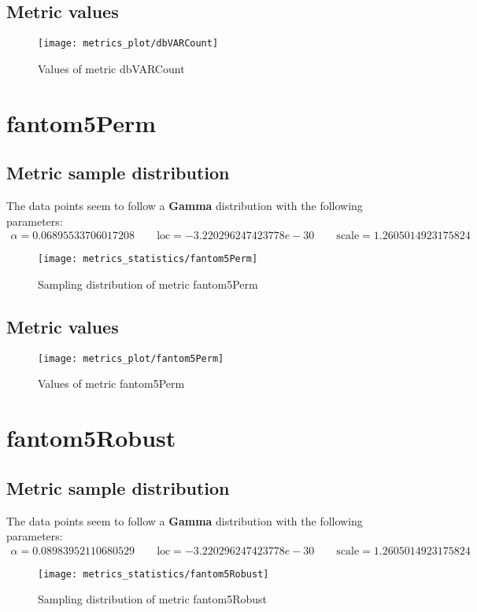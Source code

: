 \subsection{Metric values}
\begin{figure}
	\texttt{[image: metrics\_plot/dbVARCount]}
	\caption{Values of metric dbVARCount}
\end{figure}

\clearpage
\section{fantom5Perm}
\subsection{Metric sample distribution}
The data points seem to follow a \textbf{Gamma} distribution with the following parameters:
\begin{align*}
	\alpha   = 0.06895533706017208    \qquad  \text{loc} = -3.220296247423778e-30 \qquad \text{scale} = 1.2605014923175824
\end{align*}
\begin{figure}
	\texttt{[image: metrics\_statistics/fantom5Perm]}
	\caption{Sampling distribution of metric fantom5Perm}
\end{figure}
\subsection{Metric values}
\begin{figure}
	\texttt{[image: metrics\_plot/fantom5Perm]}
	\caption{Values of metric fantom5Perm}
\end{figure}

\clearpage
\section{fantom5Robust}
\subsection{Metric sample distribution}
The data points seem to follow a \textbf{Gamma} distribution with the following parameters:
\begin{align*}
	\alpha   = 0.08983952110680529    \qquad  \text{loc} = -3.220296247423778e-30 \qquad \text{scale} = 1.2605014923175824
\end{align*}
\begin{figure}
	\texttt{[image: metrics\_statistics/fantom5Robust]}
	\caption{Sampling distribution of metric fantom5Robust}
\end{figure}
